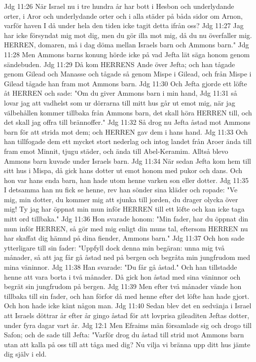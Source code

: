 Jdg 11:26  När Israel nu i tre hundra år har bott i Hesbon och underlydande orter, i Aror och underlydande orter och i alla städer på båda sidor om Arnon, varför haven I då under hela den tiden icke tagit detta ifrån oss?
Jdg 11:27  Jag har icke försyndat mig mot dig, men du gör illa mot mig, då du nu överfaller mig. HERREN, domaren, må i dag döma mellan Israels barn och Ammons barn."
Jdg 11:28  Men Ammons barns konung hörde icke på vad Jefta lät säga honom genom sändebuden.
Jdg 11:29  Då kom HERRENS Ande över Jefta; och han tågade genom Gilead och Manasse och tågade så genom Mispe i Gilead, och från Mispe i Gilead tågade han fram mot Ammons barn.
Jdg 11:30  Och Jefta gjorde ett löfte åt HERREN och sade: "Om du giver Ammons barn i min hand,
Jdg 11:31  så lovar jag att vadhelst som ur dörrarna till mitt hus går ut emot mig, när jag välbehållen kommer tillbaka från Ammons barn, det skall höra HERREN till, och det skall jag offra till brännoffer."
Jdg 11:32  Så drog nu Jefta åstad mot Ammons barn för att strida mot dem; och HERREN gav dem i hans hand.
Jdg 11:33  Och han tillfogade dem ett mycket stort nederlag och intog landet från Aroer ända till fram emot Minnit, tjugu städer, och ända till Abel-Keramim. Alltså blevo Ammons barn kuvade under Israels barn.
Jdg 11:34  När sedan Jefta kom hem till sitt hus i Mispa, då gick hans dotter ut emot honom med pukor och dans. Och hon var hans enda barn, han hade utom henne varken son eller dotter.
Jdg 11:35  I detsamma han nu fick se henne, rev han sönder sina kläder och ropade: "Ve mig, min dotter, du kommer mig att sjunka till jorden, du drager olycka över mig! Ty jag har öppnat min mun inför HERREN till ett löfte och kan icke taga mitt ord tillbaka."
Jdg 11:36  Hon svarade honom: "Min fader, har du öppnat din mun inför HERREN, så gör med mig enligt din muns tal, eftersom HERREN nu har skaffat dig hämnd på dina fiender, Ammons barn."
Jdg 11:37  Och hon sade ytterligare till sin fader: "Uppfyll dock denna min begäran: unna mig två månader, så att jag får gå åstad ned på bergen och begråta min jungfrudom med mina väninnor.
Jdg 11:38  Han svarade: "Du får gå åstad." Och han tillstadde henne att vara borta i två månader. Då gick hon åstad med sina väninnor och begrät sin jungfrudom på bergen.
Jdg 11:39  Men efter två månader vände hon tillbaka till sin fader, och han förfor då med henne efter det löfte han hade gjort. Och hon hade icke känt någon man.
Jdg 11:40  Sedan blev det en sedvänja i Israel att Israels döttrar år efter år gingo åstad för att lovprisa gileaditen Jeftas dotter, under fyra dagar vart år.
Jdg 12:1  Men Efraims män församlade sig och drogo till Safon; och de sade till Jefta: "Varför drog du åstad till strid mot Ammons barn utan att kalla på oss till att tåga med dig? Nu vilja vi bränna upp ditt hus jämte dig själv i eld.
